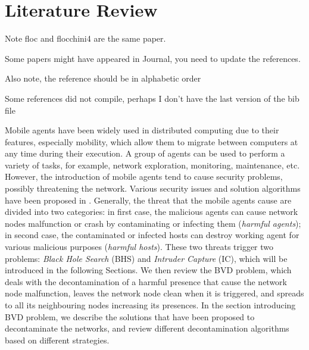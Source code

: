 \chapter {Literature Review}
\label{RW}


\color{blue}
Note {floc} and {flocchini4} are the same paper.

Some papers might have appeared in Journal, you need to update the references.

Also note, the reference should be in alphabetic order

Some references did not compile, perhaps I don't have the last version of the bib file

\color{black}
Mobile agents have been widely used in  distributed computing due to their features, especially   mobility, which allow them to migrate between computers at any time during their execution. A group of agents can be used to perform a variety of tasks, for example, network exploration, monitoring,  maintenance,   etc. However, the introduction of mobile agents tend to cause security problems, possibly  threatening the network. Various security issues and solution algorithms have been proposed  in \cite{security}. Generally, the threat  that the mobile agents cause are divided into two categories: in first case, the malicious agents can cause network nodes malfunction or crash by contaminating or infecting them ({\em harmful agents}); in second case, the contaminated or infected hosts can destroy working agent for various malicious purposes ({\em harmful hosts}). These two threats trigger two problems: {\em Black Hole Search } (BHS) and {\em Intruder Capture} (IC), which will be introduced in the following Sections. We then  review the BVD problem, which deals with the decontamination of a harmful presence that cause the network node malfunction, leaves the network node clean when it is triggered, and spreads to all its neighbouring nodes increasing its presences. In the section introducing BVD problem, we describe the solutions that have been proposed to decontaminate the networks, and review different decontamination algorithms based on different strategies.

